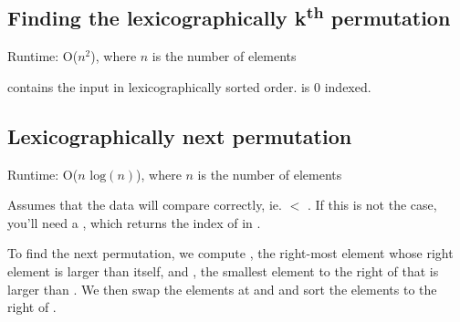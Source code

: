 
\subsection*{Finding the lexicographically  k\textsuperscript{th} permutation}

Runtime: O($n^2$), where $n$ is the number of elements

 contains the input in lexicographically sorted order.  is 0 indexed.



\subsection*{Lexicographically next permutation}

Runtime: O($n \text{ log}(n)$), where $n$ is the number of elements

Assumes that the data will compare correctly, ie.  $<$ . If this is not the case, you'll need a , which returns the index of  in .

To find the next permutation, we compute , the right-most element whose right element is larger than itself, and , the smallest element to the right of  that is larger than . We then swap the elements at  and  and sort the elements to the right of .



\newpage